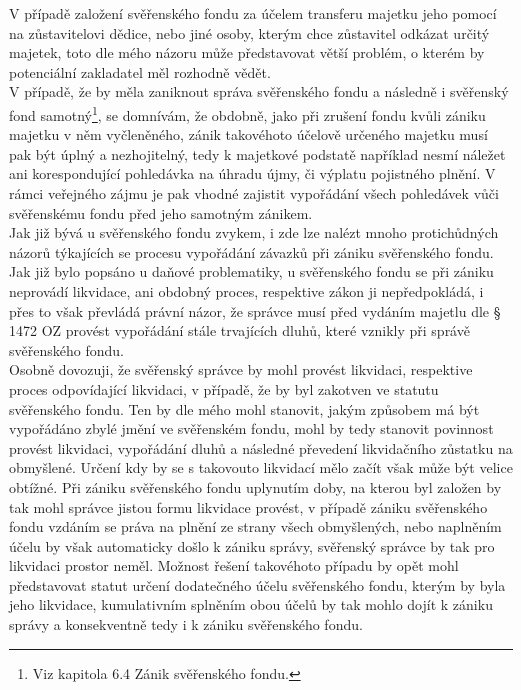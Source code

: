 \documentclass{article}
\begin{document}

V případě založení svěřenského fondu za účelem transferu majetku jeho pomocí na zůstavitelovi dědice, nebo jiné osoby, kterým chce zůstavitel odkázat určitý majetek, toto dle mého názoru může představovat větší problém, o kterém by potenciální zakladatel měl rozhodně vědět.\\

V případě, že by měla zaniknout správa svěřenského fondu a následně i svěřenský fond samotný\footnote{Viz kapitola 6.4 Zánik svěřenského fondu.}, se domnívám, že obdobně, jako při zrušení fondu kvůli zániku majetku v něm vyčleněného, zánik takovéhoto účelově určeného majetku musí pak být úplný a nezhojitelný, tedy k majetkové podstatě například nesmí náležet ani korespondující pohledávka na úhradu újmy, či výplatu pojistného plnění. V rámci veřejného zájmu je pak vhodné zajistit vypořádání všech pohledávek vůči svěřenskému fondu před jeho samotným zánikem.\\

Jak již bývá u svěřenského fondu zvykem, i zde lze nalézt mnoho protichůdných názorů týkajících se procesu vypořádání závazků při zániku svěřenského fondu. Jak již bylo popsáno u daňové problematiky, u svěřenského fondu se při zániku neprovádí likvidace, ani obdobný proces, respektive zákon ji nepředpokládá, i přes to však převládá právní názor, že správce musí před vydáním majetlu dle § 1472 OZ provést vypořádání stále trvajících dluhů, které vznikly při správě svěřenského fondu.\\

Osobně dovozuji, že svěřenský správce by mohl provést likvidaci, respektive proces odpovídající likvidaci, v případě, že by byl zakotven ve statutu svěřenského fondu. Ten by dle mého mohl stanovit, jakým způsobem má být vypořádáno zbylé jmění ve svěřenském fondu, mohl by tedy stanovit povinnost provést likvidaci, vypořádání dluhů a následné převedení likvidačního zůstatku na obmyšlené. Určení kdy by se s takovouto likvidací mělo začít však může být velice obtížné. Při zániku svěřenského fondu uplynutím doby, na kterou byl založen by tak mohl správce jistou formu likvidace provést, v případě zániku svěřenského fondu vzdáním se práva na plnění ze strany všech obmyšlených, nebo naplněním účelu by však automaticky došlo k zániku správy, svěřenský správce by tak pro likvidaci prostor neměl. Možnost řešení takovéhoto případu by opět mohl představovat statut určení dodatečného účelu svěřenského fondu, kterým by byla jeho likvidace, kumulativním splněním obou účelů by tak mohlo dojít k zániku správy a konsekventně tedy i k zániku svěřenského fondu.\\
\end{document}
